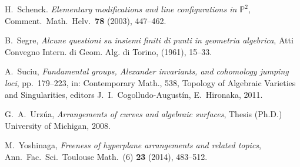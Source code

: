 \documentclass[12pt]{amsart}
\numberwithin{equation}{section}
\theoremstyle{definition}
\begin{document}
\begin{thebibliography}{BNAL}
 H.\ Schenck. 
{\it Elementary modifications and line configurations in $\mathbb P^2$}, 
Comment.\ Math.\ Helv.\ {\bf 78} (2003), 447--462. 

B.\ Segre, {\it Alcune questioni su insiemi finiti di punti in geometria algebrica}, Atti Convegno Intern. di Geom.
Alg. di Torino, (1961), 15--33.

A.\ Suciu, {\it Fundamental groups, Alexander invariants, and cohomology jumping loci}, pp.\ 179--223, in:
Contemporary Math., 538, Topology of Algebraic Varieties and Singularities, editors
J.\ I.\ Cogolludo-August\'in, E.\ Hironaka, 2011.

G.\ A.\ Urz\'ua, 
{\it Arrangements of curves and algebraic surfaces},
Thesis (Ph.D.) University of Michigan,  2008. 


M.\ Yoshinaga, {\em Freeness of hyperplane arrangements and related topics}, Ann.\ Fac.\ Sci.\ Toulouse Math.\ (6) {\bf 23} (2014), 483--512.

\end{thebibliography}
\end{document}
